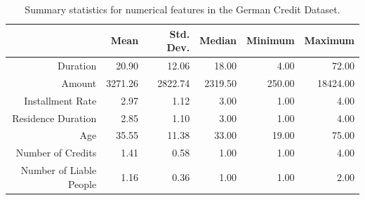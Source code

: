 \documentclass[12pt]{article}
\begin{document}
\begin{table}[ht]
\centering
\begin{tabular}{rrrrrr}
  \hline
 & Mean & Std. Dev. & Median & Minimum & Maximum \\ 
  \hline
Duration & 20.90 & 12.06 & 18.00 & 4.00 & 72.00 \\ 
  Amount & 3271.26 & 2822.74 & 2319.50 & 250.00 & 18424.00 \\ 
  Installment Rate & 2.97 & 1.12 & 3.00 & 1.00 & 4.00 \\ 
  Residence Duration & 2.85 & 1.10 & 3.00 & 1.00 & 4.00 \\ 
  Age & 35.55 & 11.38 & 33.00 & 19.00 & 75.00 \\ 
  Number of Credits & 1.41 & 0.58 & 1.00 & 1.00 & 4.00 \\ 
  Number of Liable People & 1.16 & 0.36 & 1.00 & 1.00 & 2.00 \\ 
   \hline
\end{tabular}
\caption{Summary statistics for numerical features in the German Credit Dataset.}\label{summary_numeric}
\end{table}
\end{document}
